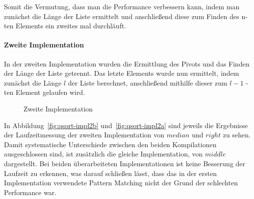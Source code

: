 Somit die Vermutung, dass man die Performance verbessern kann, indem man
zunächst die Länge der Liste ermittelt und anschließend diese zum Finden des
n-ten Elements ein zweites mal durchläuft.

\paragraph{Zweite Implementation}

In der zweiten Implementation wurden die Ermittlung des Pivots und das Finden
der Länge der Liste getrennt.
Das letzte Elements wurde nun ermittelt, indem zunächst
die Länge \(l\) der Liste berechnet, anschließend mithilfe dieser zum
\(l-1\) -ten Element gelaufen wird.
\begin{figure}[hbt]
    \centering
    \caption{Zweite Implementation}
    \hfill
\end{figure}


In Abbildung~\ref{fig:qsort-impl2b} und~\ref{fig:qsort-impl2a} sind jeweils die
Ergebnisse der Laufzeitmessung der zweiten Implementation von \(median\) und
\(right\) zu sehen.
Damit systematische Unterschiede zwischen den beiden Kompilationen
ausgeschlossen sind, ist zusätzlich die gleiche Implementation, von \(middle\)
dargestellt.
Bei beiden überarbeiteten Implementationen ist keine Besserung der Laufzeit zu
erkennen, was darauf schließen lässt, dass das in der ersten Implementation
verwendete Pattern Matching nicht der Grund der schlechten Performance war.

